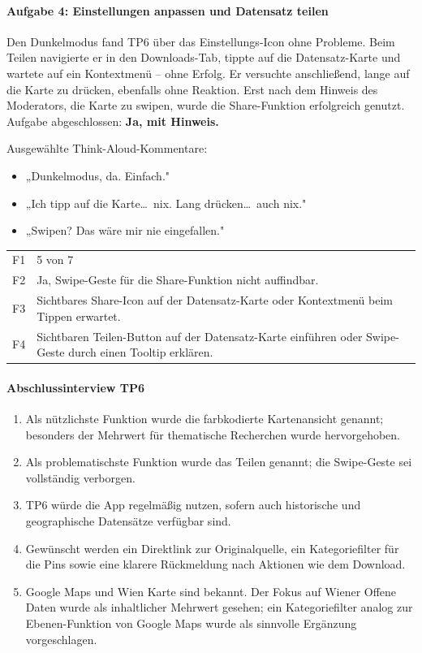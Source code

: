 \documentclass{article}
\begin{document}
\paragraph{Aufgabe 4: Einstellungen anpassen und Datensatz teilen}

Den Dunkelmodus fand TP6 über das Einstellungs-Icon ohne Probleme.
Beim Teilen navigierte er in den Downloads-Tab, tippte auf die
Datensatz-Karte und wartete auf ein Kontextmenü – ohne Erfolg.
Er versuchte anschließend, lange auf die Karte zu drücken, ebenfalls
ohne Reaktion. Erst nach dem Hinweis des Moderators, die Karte zu
swipen, wurde die Share-Funktion erfolgreich genutzt.
Aufgabe abgeschlossen: \textbf{Ja, mit Hinweis.}

Ausgewählte Think-Aloud-Kommentare:
\begin{itemize}
  \item „Dunkelmodus, da. Einfach."
  \item „Ich tipp auf die Karte\ldots\ nix. Lang drücken\ldots\ auch nix."
  \item „Swipen? Das wäre mir nie eingefallen."
\end{itemize}

\begin{tabular}{@{}lp{10cm}@{}}
  F1 & 5 von 7 \\
  F2 & Ja, Swipe-Geste für die Share-Funktion nicht auffindbar. \\
  F3 & Sichtbares Share-Icon auf der Datensatz-Karte oder Kontextmenü
       beim Tippen erwartet. \\
  F4 & Sichtbaren Teilen-Button auf der Datensatz-Karte einführen
       oder Swipe-Geste durch einen Tooltip erklären. \\
\end{tabular}

\paragraph{Abschlussinterview TP6}

\begin{enumerate}
  \item Als nützlichste Funktion wurde die farbkodierte Kartenansicht
        genannt; besonders der Mehrwert für thematische Recherchen wurde
        hervorgehoben.
  \item Als problematischste Funktion wurde das Teilen genannt; die
        Swipe-Geste sei vollständig verborgen.
  \item TP6 würde die App regelmäßig nutzen, sofern auch historische
        und geographische Datensätze verfügbar sind.
  \item Gewünscht werden ein Direktlink zur Originalquelle, ein
        Kategoriefilter für die Pins sowie eine klarere Rückmeldung
        nach Aktionen wie dem Download.
  \item Google Maps und Wien Karte sind bekannt. Der Fokus auf Wiener
        Offene Daten wurde als inhaltlicher Mehrwert gesehen;
        ein Kategoriefilter analog zur Ebenen-Funktion von Google Maps
        wurde als sinnvolle Ergänzung vorgeschlagen.
\end{enumerate}
\end{document}
